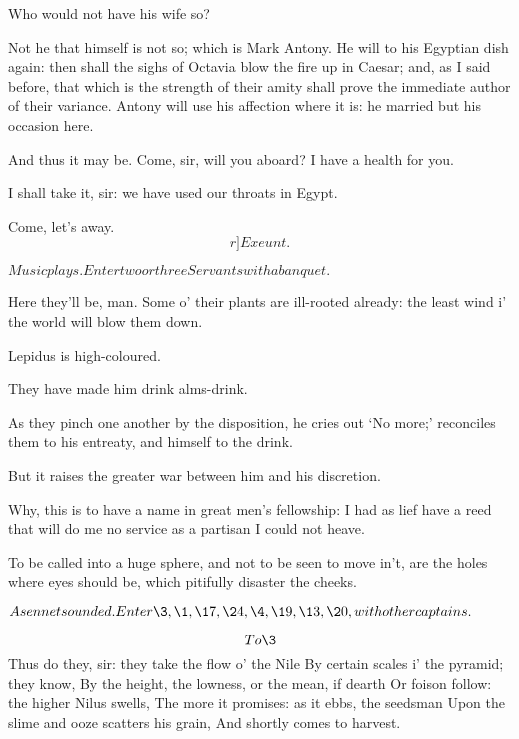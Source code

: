 \documentclass{book}
\begin{document}
\begin{PROSE}
	Who would not have his wife so?

	Not he that himself is not so; which is Mark Antony.
	He will to his Egyptian dish again: then shall the
	sighs of Octavia blow the fire up in Caesar; and, as
	I said before, that which is the strength of their
	amity shall prove the immediate author of their
	variance. Antony will use his affection where it is:
	he married but his occasion here.

	And thus it may be. Come, sir, will you aboard?
	I have a health for you.

	I shall take it, sir: we have used our throats in Egypt.

	Come, let's away. \[r]Exeunt.\]
\end{PROSE}




	\(Music plays. Enter two or three Servants with a banquet.\)

\begin{PROSE}

	Here they'll be, man. Some o' their plants are
	ill-rooted already: the least wind i' the world
	will blow them down.

	Lepidus is high-coloured.

 They have made him drink alms-drink.

	As they pinch one another by the disposition, he
	cries out `No more;' reconciles them to his
	entreaty, and himself to the drink.

	But it raises the greater war between him and
	his discretion.

	Why, this is to have a name in great men's
	fellowship: I had as lief have a reed that will do
	me no service as a partisan I could not heave.

 To be called into a huge sphere, and not to be seen
	to move in't, are the holes where eyes should be,
	which pitifully disaster the cheeks.

\end{PROSE}

	\(A sennet sounded. Enter \3, \1, \17, \24,
          \4, \19, \13, \20, with other captains.\)

\1 \[To \3\]  Thus do they, sir: they take the flow o' the Nile
	By certain scales i' the pyramid; they know,
	By the height, the lowness, or the mean, if dearth
	Or foison follow: the higher Nilus swells,
	The more it promises: as it ebbs, the seedsman
	Upon the slime and ooze scatters his grain,
	And shortly comes to harvest.
\end{document}
